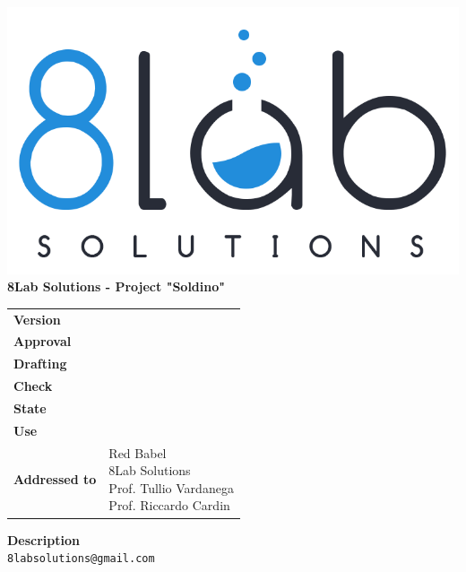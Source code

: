 \thispagestyle{empty}
\begin{titlepage}
	\begin{center}
		\includegraphics[scale = 0.3]{res/images/logo8_crop.png}\\
		\large \textbf{8Lab Solutions - Project "Soldino"} \\
		\vfill
		\Huge \textbf{\doctitle}
		\vspace*{\fill}
        
        \vfill
        \large
    \end{center}
	\begin{table}[htbp]
        \centering
        \hspace*{2cm}
        \begin{tabular}{l|l}
            \textbf{Version} & \rev{} \\
            \textbf{Approval} & \approv{} \\
            \textbf{Drafting} & \red{} \\
            \textbf{Check} & \ver{} \\
            \textbf{State} & \stato{} \\
            \textbf{Use} & \uso{} \\
            \textbf{Addressed to} & \parbox[t]{5cm}{Red Babel \\8Lab Solutions
            \\Prof. Tullio Vardanega\\Prof. Riccardo Cardin}
        \end{tabular}
    \end{table}
    \begin{center}
        \vfill
        \normalsize
        \textbf{Description}\\
		\describedoc
        \vfill
        \small
        \texttt{8labsolutions@gmail.com}
	\end{center}
\end{titlepage}
